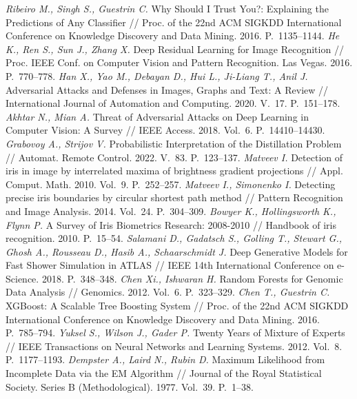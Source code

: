 \documentclass[12pt]{a&t}
\begin{document}
\begin{thebibliography}{}
	\textit{Ribeiro M., Singh S., Guestrin C.} Why Should I Trust You?: Explaining the Predictions of Any Classifier // Proc. of the 22nd ACM SIGKDD International Conference on Knowledge Discovery and Data Mining. 2016. P.~1135--1144.
	\textit{He K., Ren S., Sun J., Zhang X.} Deep Residual Learning for Image Recognition // Proc. IEEE Conf. on Computer Vision and Pattern Recognition. Las Vegas. 2016. P.~770--778.
	\textit{Han X., Yao M., Debayan D., Hui L., Ji-Liang T., Anil J.} Adversarial Attacks and Defenses in Images, Graphs and Text: A Review // International Journal of Automation and Computing. 2020. V.~17. P.~151--178.
	\textit{Akhtar N., Mian A.} Threat of Adversarial Attacks on Deep Learning in Computer Vision: A Survey // IEEE Access. 2018. Vol.~6. P.~14410--14430.
	\textit{Grabovoy A., Strijov V.} Probabilistic Interpretation of the Distillation Problem // Automat. Remote Control. 2022. V.~83. P.~123--137.
	\textit{Matveev I.} Detection of iris in image by interrelated maxima of brightness gradient projections // Appl. Comput. Math. 2010. Vol.~9. P.~252--257.
	\textit{Matveev I., Simonenko I.} Detecting precise iris boundaries by circular shortest path method // Pattern Recognition and Image Analysis. 2014. Vol.~24. P.~304--309.
	\textit{Bowyer K., Hollingsworth K., Flynn P.} A Survey of Iris Biometrics Research: 2008-2010 // Handbook of iris recognition. 2010. P.~15--54.
	\textit{Salamani D., Gadatsch S., Golling T.,  Stewart G., Ghosh A.,  Rousseau D.,  Hasib A.,  Schaarschmidt J.} Deep Generative Models for Fast Shower Simulation in ATLAS // IEEE 14th International Conference on e-Science. 2018. P.~348--348.
	\textit{Chen Xi., Ishwaran H.} Random Forests for Genomic Data Analysis // Genomics. 2012. Vol.~6. P.~323--329.
	\textit{Chen T., Guestrin C.} XGBoost: A Scalable Tree Boosting System // Proc. of the 22nd ACM SIGKDD International Conference on Knowledge Discovery and Data Mining. 2016. P.~785--794.
	\textit{Yuksel S., Wilson J., Gader P.} Twenty Years of Mixture of Experts // IEEE Transactions on Neural Networks and Learning Systems. 2012. Vol.~8. P.~1177--1193.
	\textit{Dempster A., Laird N., Rubin D.} Maximum Likelihood from Incomplete Data via the EM Algorithm // Journal of the Royal Statistical Society. Series B (Methodological). 1977. Vol.~39. P.~1--38.

\end{thebibliography}
\end{document}
